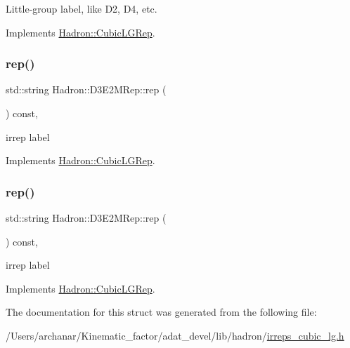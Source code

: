 Little-\/group label, like D2, D4, etc. 

Implements \mbox{\hyperlink{structHadron_1_1CubicLGRep_a9bdb14b519a611d21379ed96a3a9eb41}{Hadron\+::\+Cubic\+L\+G\+Rep}}.

\mbox{\label{structHadron_1_1D3E2MRep_aa19ff7cb3edd937564ed3bbb3c9fe36b}} 
\subsubsection{\texorpdfstring{rep()}{rep()}\hspace{0.1cm}{\footnotesize\ttfamily [1/2]}}
{\footnotesize\ttfamily std\+::string Hadron\+::\+D3\+E2\+M\+Rep\+::rep (\begin{DoxyParamCaption}{ }\end{DoxyParamCaption}) const\hspace{0.3cm}{\ttfamily [inline]}, {\ttfamily [virtual]}}

irrep label 

Implements \mbox{\hyperlink{structHadron_1_1CubicLGRep_a50f5ddbb8f4be4cee0106fa9e8c75e6c}{Hadron\+::\+Cubic\+L\+G\+Rep}}.

\mbox{\label{structHadron_1_1D3E2MRep_aa19ff7cb3edd937564ed3bbb3c9fe36b}} 
\subsubsection{\texorpdfstring{rep()}{rep()}\hspace{0.1cm}{\footnotesize\ttfamily [2/2]}}
{\footnotesize\ttfamily std\+::string Hadron\+::\+D3\+E2\+M\+Rep\+::rep (\begin{DoxyParamCaption}{ }\end{DoxyParamCaption}) const\hspace{0.3cm}{\ttfamily [inline]}, {\ttfamily [virtual]}}

irrep label 

Implements \mbox{\hyperlink{structHadron_1_1CubicLGRep_a50f5ddbb8f4be4cee0106fa9e8c75e6c}{Hadron\+::\+Cubic\+L\+G\+Rep}}.



The documentation for this struct was generated from the following file\+:\begin{DoxyCompactItemize}
\item 
/\+Users/archanar/\+Kinematic\+\_\+factor/adat\+\_\+devel/lib/hadron/\mbox{\hyperlink{lib_2hadron_2irreps__cubic__lg_8h}{irreps\+\_\+cubic\+\_\+lg.\+h}}\end{DoxyCompactItemize}
